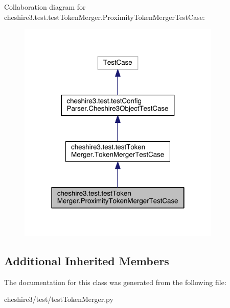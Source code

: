 Collaboration diagram for cheshire3.\-test.\-test\-Token\-Merger.\-Proximity\-Token\-Merger\-Test\-Case\-:
\nopagebreak
\begin{figure}[H]
\begin{center}
\leavevmode
\includegraphics[width=274pt]{classcheshire3_1_1test_1_1test_token_merger_1_1_proximity_token_merger_test_case__coll__graph}
\end{center}
\end{figure}
\subsection*{Additional Inherited Members}


The documentation for this class was generated from the following file\-:\begin{DoxyCompactItemize}
\item 
cheshire3/test/test\-Token\-Merger.\-py\end{DoxyCompactItemize}
